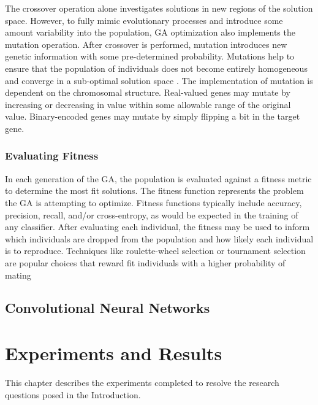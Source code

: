 \documentclass[12pt]{report}
\begin{document}
The crossover operation alone investigates solutions in new regions of the solution space. However, to fully mimic evolutionary processes and introduce some amount variability into the population, GA optimization also implements the mutation operation. After crossover is performed, mutation introduces new genetic information with some pre-determined probability. Mutations help to ensure that the population of individuals does not become entirely homogeneous and converge in a sub-optimal solution space \cite{holland1992genetic}. The implementation of mutation is dependent on the chromosomal structure. Real-valued genes may mutate by increasing or decreasing in value within some allowable range of the original value. Binary-encoded genes may mutate by simply flipping a bit in the target gene.

\subsection{Evaluating Fitness}
In each generation of the GA, the population is evaluated against a fitness metric to determine the most fit solutions. The fitness function represents the problem the GA is attempting to optimize. Fitness functions typically include accuracy, precision, recall, and/or cross-entropy, as would be expected in the training of any classifier. After evaluating each individual, the fitness may be used to inform which individuals are dropped from the population and how likely each individual is to reproduce. Techniques like roulette-wheel selection or tournament selection are popular choices that reward fit individuals with a higher probability of mating \cite{zhong2005comparison}



\section{Convolutional Neural Networks}



\chapter{Experiments and Results}

This chapter describes the experiments completed to resolve the research questions posed in the Introduction.

\end{document}
